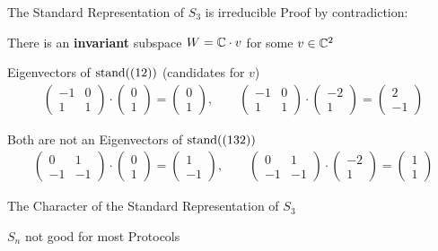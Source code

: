 \begin{frame}{The Standard Representation of $S_3$ is irreducible}
    Proof by contradiction:

    \vspace{1em}
    There is an \textbf{invariant} subspace $W = \mathbb{C} \cdot v$ for some $v \in \mathbb{C}^2$

    \pause
    \vspace{1em}
    Eigenvectors of $\operatorname{stand}((12))$ (candidates for $v$)
    \begin{align*}
        \begin{pmatrix}
            -1 & 0 \\
            1 & 1
        \end{pmatrix} \cdot \begin{pmatrix}
            0 \\ 1
        \end{pmatrix} = \begin{pmatrix}
            0 \\ 1
        \end{pmatrix}, \qquad \begin{pmatrix}
            -1 & 0 \\
            1 & 1
        \end{pmatrix} \cdot \begin{pmatrix}
            -2 \\ 1
        \end{pmatrix} = \begin{pmatrix}
            2 \\ -1
        \end{pmatrix}
    \end{align*}
    
    \pause
    Both are not an Eigenvectors of $\operatorname{stand}((132))$
    \begin{align*}
        \begin{pmatrix}
            0 & 1 \\
            -1 & -1
        \end{pmatrix} \cdot \begin{pmatrix}
            0 \\ 1
        \end{pmatrix} = \begin{pmatrix}
            1 \\ -1
        \end{pmatrix}, \qquad \begin{pmatrix}
            0 & 1 \\
            -1 & -1
        \end{pmatrix} \cdot \begin{pmatrix}
            -2 \\ 1
        \end{pmatrix} = \begin{pmatrix}
            1 \\ 1
        \end{pmatrix}
    \end{align*}
\end{frame}

\begin{frame}{The Character of the Standard Representation of $S_3$}
    
\end{frame}

\begin{frame}{$S_n$ not good for most Protocols}
\end{frame}
